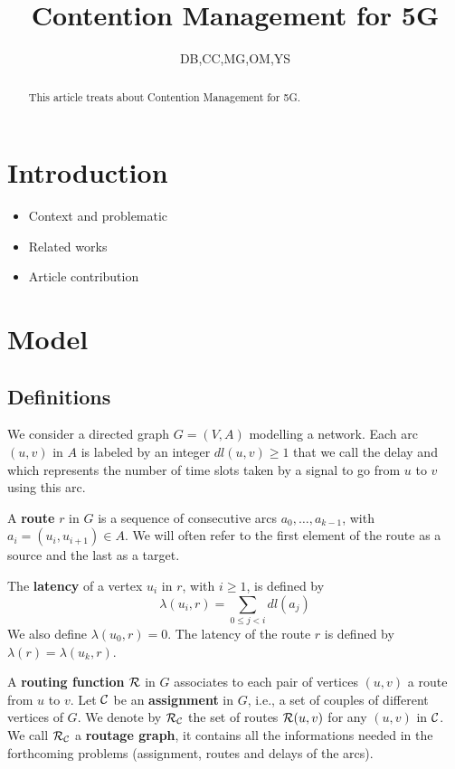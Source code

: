 \documentclass[a4paper,10pt]{article}
\title{Contention Management for 5G}
\author{DB,CC,MG,OM,YS}
\begin{document}
\maketitle

\begin{abstract}
This article treats about Contention Management for 5G.
\end{abstract}

\section{Introduction}
  \begin{itemize}
    \item Context and problematic
    \item Related works
    \item Article contribution
  \end{itemize}

  

\section{Model}

  \subsection{Definitions}
  

  
	We consider a directed graph $G=(V,A)$ modelling a network. Each arc  $(u,v)$ in $A$ is labeled by an integer $dl(u,v) \geq 1$ that we call the delay and
	which represents the number of time slots taken by a signal to go from $u$ to $v$ using this arc. 
	
      A {\bf route} $r$ in $G$ is a sequence of consecutive arcs $a_0, \ldots , a_{k-1}$, with $a_i=(u_i,u_{i+1}) \in A$. 
      We will often refer to the first element of the route as a source and the last as a target.
      
      The {\bf latency} of a vertex $u_i$ in $r$, with $i \geq 1$, is defined by $$\lambda(u_i,r)= \sum\limits_{0 \leq j <i} dl(a_j)$$ We also define $\lambda(u_0,r)=0$.
      The latency of the route $r$ is defined by $\lambda (r)= \lambda (u_k,r)$.
      

      A {\bf routing function} $\cal R$ in $G$ associates to each pair of vertices $(u,v)$ a route from $u$ to $v$. Let $\cal C$ be an {\bf assignment} in $G$, i.e., a set of couples of different vertices of $G$. We denote by $\cal R_{\cal C}$ the set of routes ${\cal R}(u,v)$ for any $(u,v)$ in $\cal C$. We call $\cal R_{\cal C}$ a {\bf routage graph}, it contains all the informations needed in the forthcoming problems (assignment, routes and delays of the arcs). 
      
\end{document}
